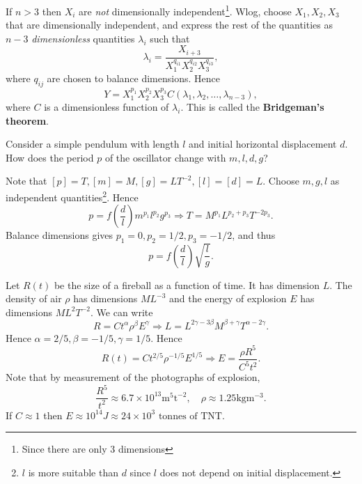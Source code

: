 If $n>3$ then $X_i$ are \textit{not} dimensionally independent\footnote{Since there are only 3 dimensions}. Wlog, choose $X_1,X_2,X_3$ that are dimensionally independent, and express the rest of the quantities as $n-3$ \textit{dimensionless} quantities $ \lambda_i $ such that 
\[
    \lambda_{i} = \frac{X_{i+3}}{X_1^{q_{i1}}X_2^{q_{i2}}X_3^{q_{i3}}},
\]
where $q_{ij}$ are chosen to balance dimensions. Hence 
\[
    Y=X_1^{p_1}X_2^{p_2}X_3^{p_3}C(\lambda_1,\lambda_2,\dots,\lambda_{n-3}),
\]
where $C$ is a dimensionless function of $ \lambda_i $. This is called the \textbf{Bridgeman's theorem}.

\begin{example}
    Consider a simple pendulum with length $l$ and initial horizontal displacement $d$. How does the period $p$ of the oscillator change with $m,l,d,g$?
    \begin{center}
    \end{center}
    Note that $ [p]=T, [m]=M, [g]=LT^{-2}, [l]=[d]=L $. Choose $m,g,l$ as independent quantities\footnote{$l$ is more suitable than $d$ since $l$ does not depend on initial displacement.}. Hence 
    \[
        p = f\left( \frac{d}{l} \right)m^{p_1}l^{p_2}g^{p_3} \Longrightarrow T=M^{p_1}L^{p_2+p_3}T^{-2p_3}.
    \]
    Balance dimensions gives $ p_1=0, p_2= 1/2, p_3=-1/2$, and thus 
    \[
        p = f\left( \frac{d}{l} \right) \sqrt{\frac{l}{g}}.
    \]
\end{example}
\begin{example}
    Let $ R(t) $ be the size of a fireball as a function of time. It has dimension $ L $. The density of air $\rho$ has dimensions $ ML^{-3} $ and the energy of explosion $E$ has dimensions $ ML^2T^{-2} $. We can write 
    \[
        R = C t^{\alpha}\rho^{\beta}E^{\gamma}\Longrightarrow L=L^{2\gamma-3\beta}M^{\beta+\gamma}T^{\alpha-2\gamma}.
    \]
    Hence $ \alpha=2/5 , \beta=-1/5,\gamma=1/5 $. Hence
    \[
        R(t)=C t^{2/5}\rho^{-1/5}E^{1/5} \Longrightarrow E = \frac{\rho R^5}{C^5 t^2}.
    \]
    Note that by measurement of the photographs of explosion,
    \[
        \frac{R^5}{t^2} \approx 6.7 \times 10^{13} \mathrm{m}^5 \mathrm{t}^{-2},\quad \rho \approx 1.25 \mathrm{kg} \mathrm{m}^{-3}.
    \]
    If $C\approx 1$ then $ E \approx 10^{14}J \approx 24 \times 10^{3} \text{ tonnes of TNT} $.
\end{example}